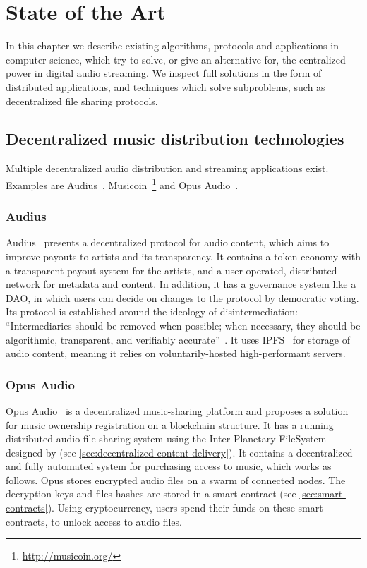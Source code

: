 \chapter{\label{chap:state-of-the-art}State of the Art}
In this chapter we describe existing algorithms, protocols and applications in computer science, which try to solve, or give an alternative for, the centralized power in digital audio streaming. We inspect full solutions in the form of distributed applications, and techniques which solve subproblems, such as decentralized file sharing protocols.
\section{Decentralized music distribution technologies}
Multiple decentralized audio distribution and streaming applications exist. Examples are Audius~\citep{audius2018}, Musicoin~\footnote{\url{http://musicoin.org/}} and Opus Audio~\citep{jia2016opus}.

\subsection{Audius}
Audius~\citep{audius2018} presents a decentralized protocol for audio content, which aims to improve payouts to artists and its transparency. It contains a token economy with a transparent payout system for the artists, and a user-operated, distributed network for metadata and content. In addition, it has a governance system like a DAO, in which users can decide on changes to the protocol by democratic voting. Its protocol is established around the ideology of disintermediation: ``Intermediaries  should  be  removed  when  possible; when necessary, they should be algorithmic, transparent, and verifiably accurate''~\citep{audius2018}. It uses IPFS~\citep{benet2014ipfs} for storage of audio content, meaning it relies on voluntarily-hosted high-performant servers.

\subsection{Opus Audio}
Opus Audio~\citep{jia2016opus} is a decentralized music-sharing platform and proposes a solution for music ownership registration on a blockchain structure. It has a running distributed audio file sharing system using the Inter-Planetary FileSystem designed by \cite{benet2014ipfs} (see \ref{sec:decentralized-content-delivery}). It contains a decentralized and fully automated system for purchasing access to music, which works as follows. Opus stores encrypted audio files on a swarm of connected nodes. The decryption keys and files hashes are stored in a smart contract (see \ref{sec:smart-contracts}). Using cryptocurrency, users spend their funds on these smart contracts, to unlock access to audio files.

